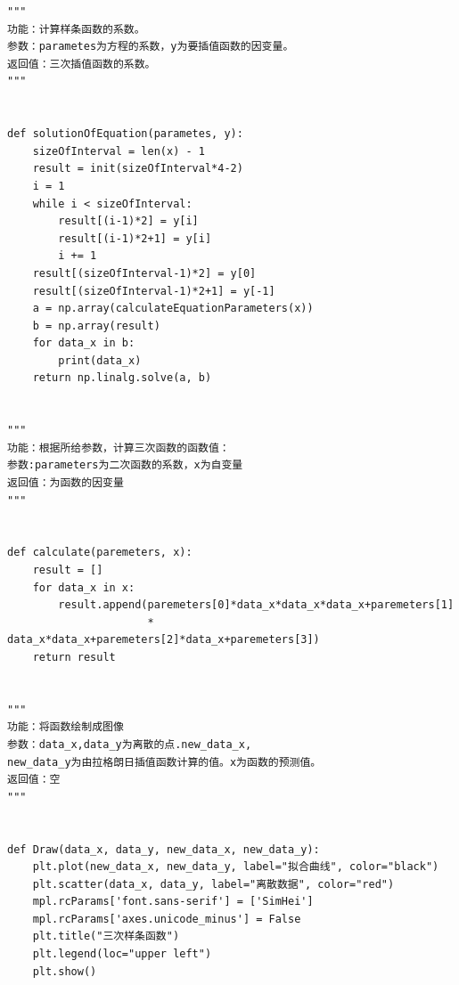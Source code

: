 \begin{verbatim}
"""
功能：计算样条函数的系数。
参数：parametes为方程的系数，y为要插值函数的因变量。
返回值：三次插值函数的系数。
"""


def solutionOfEquation(parametes, y):
    sizeOfInterval = len(x) - 1
    result = init(sizeOfInterval*4-2)
    i = 1
    while i < sizeOfInterval:
        result[(i-1)*2] = y[i]
        result[(i-1)*2+1] = y[i]
        i += 1
    result[(sizeOfInterval-1)*2] = y[0]
    result[(sizeOfInterval-1)*2+1] = y[-1]
    a = np.array(calculateEquationParameters(x))
    b = np.array(result)
    for data_x in b:
        print(data_x)
    return np.linalg.solve(a, b)


"""
功能：根据所给参数，计算三次函数的函数值：
参数:parameters为二次函数的系数，x为自变量
返回值：为函数的因变量
"""


def calculate(paremeters, x):
    result = []
    for data_x in x:
        result.append(paremeters[0]*data_x*data_x*data_x+paremeters[1]
                      * data_x*data_x+paremeters[2]*data_x+paremeters[3])
    return result


"""
功能：将函数绘制成图像
参数：data_x,data_y为离散的点.new_data_x,
new_data_y为由拉格朗日插值函数计算的值。x为函数的预测值。
返回值：空
"""


def Draw(data_x, data_y, new_data_x, new_data_y):
    plt.plot(new_data_x, new_data_y, label="拟合曲线", color="black")
    plt.scatter(data_x, data_y, label="离散数据", color="red")
    mpl.rcParams['font.sans-serif'] = ['SimHei']
    mpl.rcParams['axes.unicode_minus'] = False
    plt.title("三次样条函数")
    plt.legend(loc="upper left")
    plt.show()
\end{verbatim}









\pagebreak